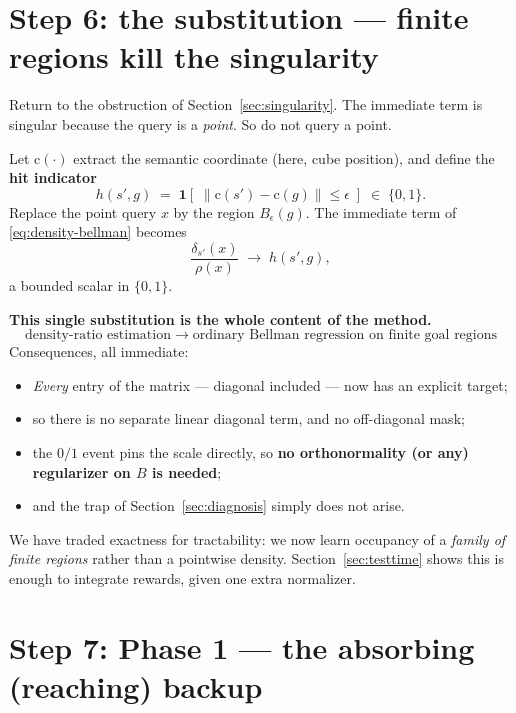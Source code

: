 \documentclass[11pt]{article}
\newcommand{\ind}[1]{\mathbf{1}\!\left[#1\right]}
\newcommand{\ball}[1]{B_\epsilon(#1)}
\newcommand{\cube}{\mathrm{c}}
\begin{document}
\section{Step 6: the substitution --- finite regions kill the singularity}
\label{sec:substitution}

Return to the obstruction of Section~\ref{sec:singularity}. The immediate term is
singular because the query is a \emph{point}. So do not query a point.

Let $\cube(\cdot)$ extract the semantic coordinate (here, cube position), and
define the \textbf{hit indicator}
\begin{equation}
\label{eq:hit}
h(s',g) \;=\; \ind{\;\|\cube(s') - \cube(g)\| \le \epsilon\;}\;\in\;\{0,1\}.
\end{equation}
Replace the point query $x$ by the region $\ball{g}$. The immediate term of
\eqref{eq:density-bellman} becomes
\[
\frac{\delta_{s'}(x)}{\rho(x)}\;\longrightarrow\; h(s',g),
\]
a bounded scalar in $\{0,1\}$.

\begin{keybox}
\textbf{This single substitution is the whole content of the method.}
\[
\text{density-ratio estimation} \;\longrightarrow\; \text{ordinary Bellman regression on finite goal regions}
\]
Consequences, all immediate:
\begin{itemize}[nosep,leftmargin=1.2em]
  \item \emph{Every} entry of the matrix --- diagonal included --- now has an explicit target;
  \item so there is no separate linear diagonal term, and no off-diagonal mask;
  \item the $0/1$ event pins the scale directly, so \textbf{no orthonormality (or any) regularizer on $B$ is needed};
  \item and the trap of Section~\ref{sec:diagnosis} simply does not arise.
\end{itemize}
\end{keybox}

We have traded exactness for tractability: we now learn occupancy of a
\emph{family of finite regions} rather than a pointwise density. Section~\ref{sec:testtime}
shows this is enough to integrate rewards, given one extra normalizer.

\section{Step 7: Phase 1 --- the absorbing (reaching) backup}
\label{sec:phase1}
\end{document}

